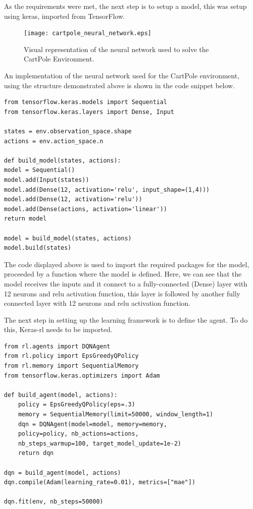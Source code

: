     As the requirements were met, the next step is to setup a model, this was setup using keras, imported from TensorFlow.
\begin{figure}[H]
    \centering
    \texttt{[image: cartpole\_neural\_network.eps]}
    \caption{Visual representation of the neural network used to solve the CartPole Environment. }
    \label{fig:cartpole_neural_network}
\end{figure}
An implementation of the neural network used for the CartPole environment, using the structure demonstrated above is shown in the code snippet below.

\lstset{language=Python}
\lstset{frame=lines}
\lstset{basicstyle=\footnotesize}
\begin{lstlisting}
from tensorflow.keras.models import Sequential
from tensorflow.keras.layers import Dense, Input

states = env.observation_space.shape
actions = env.action_space.n

def build_model(states, actions):
model = Sequential() 
model.add(Input(states))
model.add(Dense(12, activation='relu', input_shape=(1,4)))
model.add(Dense(12, activation='relu'))
model.add(Dense(actions, activation='linear'))
return model

model = build_model(states, actions)
model.build(states)
\end{lstlisting}
    
    The code displayed above is used to import the required packages for the model, proceeded by a function where the model is defined. Here, we can see that the model receives the inputs and it connect to a fully-connected (Dense) layer with 12 neurons and relu activation function,
    this layer is followed by another fully connected layer with 12 neurons and relu activation function.
    
    The next step in setting up the learning framework is to define the agent. To do this, Keras-rl needs to be imported.
    
\lstset{language=Python}
\lstset{frame=lines}
\lstset{basicstyle=\footnotesize}
\begin{lstlisting}
from rl.agents import DQNAgent
from rl.policy import EpsGreedyQPolicy
from rl.memory import SequentialMemory          
from tensorflow.keras.optimizers import Adam

def build_agent(model, actions):
    policy = EpsGreedyQPolicy(eps=.3)
    memory = SequentialMemory(limit=50000, window_length=1)
    dqn = DQNAgent(model=model, memory=memory, 
    policy=policy, nb_actions=actions, 
    nb_steps_warmup=100, target_model_update=1e-2)
    return dqn

dqn = build_agent(model, actions)
dqn.compile(Adam(learning_rate=0.01), metrics=["mae"])

dqn.fit(env, nb_steps=50000)
\end{lstlisting}

